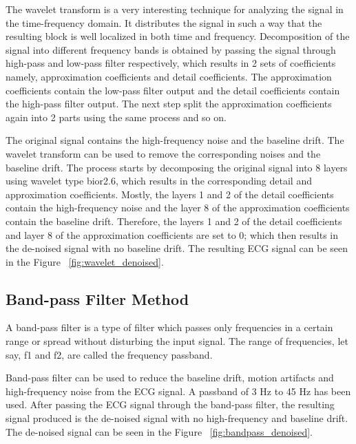The wavelet transform is a very interesting technique for analyzing the signal in the time-frequency domain. It distributes the signal in such a way that the resulting block is well localized in both time and frequency. Decomposition of the signal into different frequency bands is obtained by passing the signal through high-pass and low-pass filter respectively, which results in 2 sets of coefficients namely, approximation coefficients and detail coefficients. The approximation coefficients contain the low-pass filter output and the detail coefficients contain the high-pass filter output. The next step split the approximation coefficients again into 2 parts using the same process and so on.

The original signal contains the high-frequency noise and the baseline drift. The wavelet transform can be used to remove the corresponding noises and the baseline drift. The process starts by decomposing the original signal into 8 layers using wavelet type bior2.6, which results in the corresponding detail and approximation coefficients. Mostly, the layers 1 and 2 of the detail coefficients contain the high-frequency noise and the layer 8 of the approximation coefficients contain the baseline drift. Therefore, the layers 1 and 2 of the detail coefficients and layer 8 of the approximation coefficients are set to 0; which then results in the de-noised signal with no baseline drift. The resulting ECG signal can be seen in the Figure ~\ref{fig:wavelet_denoised}. 




\subsection{Band-pass Filter Method}
A band-pass filter is a type of filter which passes only frequencies in a certain range or spread without disturbing the input signal. The range of frequencies, let say, f1 and f2, are called the frequency passband.

Band-pass filter can be used to reduce the baseline drift, motion artifacts and high-frequency noise from the ECG signal. A passband of 3 Hz to 45 Hz has been used. After passing the ECG signal through the band-pass filter, the resulting signal produced is the de-noised signal with no high-frequency and baseline drift. The de-noised signal can be seen in the Figure ~\ref{fig:bandpass_denoised}. 

